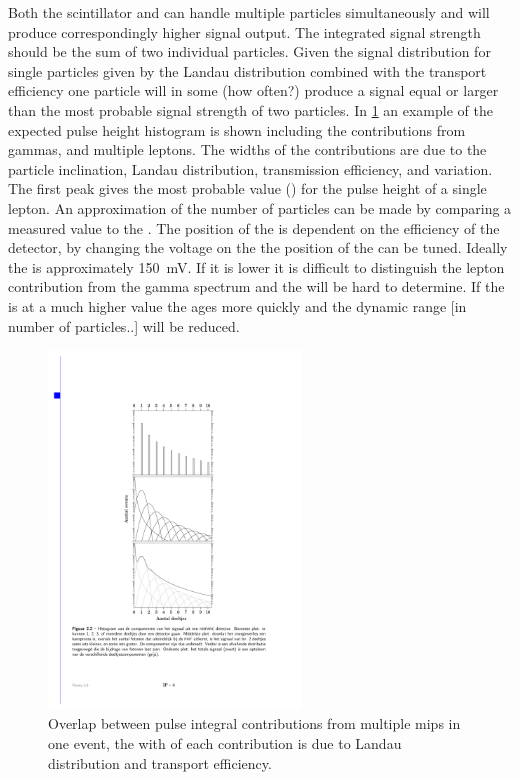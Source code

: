 Both the scintillator and \pmt can handle multiple particles simultaneously and will produce correspondingly higher signal output. The integrated signal strength should be the sum of two individual particles. Given the signal distribution for single particles given by the Landau distribution combined with the transport efficiency one particle will in some (how often?) produce a signal equal or larger than the most probable signal strength of two particles. In \cref{fig:ph_histogram_contrib} an example of the expected pulse height histogram is shown including the contributions from gammas, and multiple leptons. The widths of the contributions are due to the particle inclination, Landau distribution, transmission efficiency, and \pmt variation. The first peak gives the most probable value (\mpv) for the pulse height of a single lepton. An approximation of the number of particles can be made by comparing a measured value to the \mpv. The position of the \mpv is dependent on the efficiency of the detector, by changing the voltage on the \pmt the position of the \mpv can be tuned. Ideally the \mpv is approximately \SI{150}{\mV}. If it is lower it is difficult to distinguish the lepton contribution from the gamma spectrum and the \mpv will be hard to determine. If the \mpv is at a much higher value the \pmt ages more quickly and the dynamic range [in number of particles..] will be reduced.

\begin{figure}
    \centering
    \includegraphics[width=0.6\textwidth]
                    {plots/station/ph_histogram_contrib}
    \caption{Overlap between pulse integral contributions from multiple mips in one event, the with of each contribution is due to Landau distribution and transport efficiency.}
    \label{fig:ph_histogram_contrib}
\end{figure}

